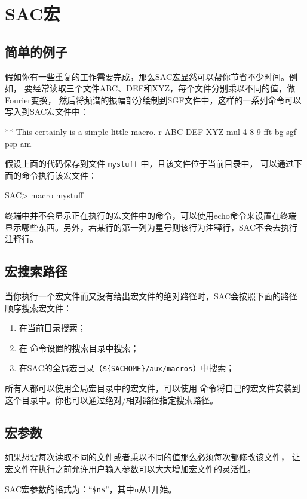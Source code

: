 \section{SAC宏}
\label{sec:macros}

\subsection{简单的例子}
假如你有一些重复的工作需要完成，那么SAC宏显然可以帮你节省不少时间。例如，
要经常读取三个文件ABC、DEF和XYZ，每个文件分别乘以不同的值，做Fourier变换，
然后将频谱的振幅部分绘制到SGF文件中，这样的一系列命令可以写入到SAC宏文件中：
\begin{SACCode}
** This certainly is a simple little macro.
r ABC DEF XYZ
mul 4 8 9
fft
bg sgf
psp am
\end{SACCode}

假设上面的代码保存到文件 \texttt{mystuff} 中，且该文件位于当前目录中，
可以通过下面的命令执行该宏文件：
\begin{SACCode}
SAC> macro mystuff
\end{SACCode}
终端中并不会显示正在执行的宏文件中的命令，可以使用echo命令来设置在终端
显示哪些东西。另外，若某行的第一列为星号则该行为注释行，SAC不会去执行
注释行。

\subsection{宏搜索路径}
当你执行一个宏文件而又没有给出宏文件的绝对路径时，SAC会按照下面的路径
顺序搜索宏文件：
\begin{enumerate}
\item 在当前目录搜索；
\item 在  命令设置的搜索目录中搜索；
\item 在SAC的全局宏目录（\verb|${SACHOME}/aux/macros|）中搜索；
\end{enumerate}

所有人都可以使用全局宏目录中的宏文件，可以使用 
命令将自己的宏文件安装到这个目录中。你也可以通过绝对/相对路径指定搜索路径。

\subsection{宏参数}
如果想要每次读取不同的文件或者乘以不同的值那么必须每次都修改该文件，
让宏文件在执行之前允许用户输入参数可以大大增加宏文件的灵活性。

SAC宏参数的格式为：``\verb|$n$|''，其中n从1开始。

